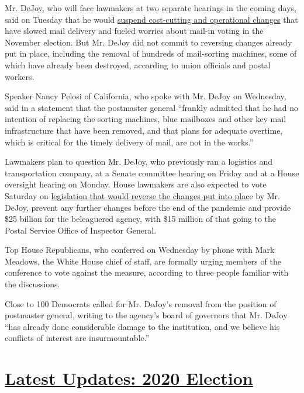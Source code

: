 Mr. DeJoy, who will face lawmakers at two separate hearings in the
coming days, said on Tuesday that he would
\href{https://www.nytimes3xbfgragh.onion/2020/08/18/us/politics/postal-service-suspends-changes.html}{suspend
cost-cutting and operational changes} that have slowed mail delivery and
fueled worries about mail-in voting in the November election. But Mr.
DeJoy did not commit to reversing changes already put in place,
including the removal of hundreds of mail-sorting machines, some of
which have already been destroyed, according to union officials and
postal workers.

Speaker Nancy Pelosi of California, who spoke with Mr. DeJoy on
Wednesday, said in a statement that the postmaster general ``frankly
admitted that he had no intention of replacing the sorting machines,
blue mailboxes and other key mail infrastructure that have been removed,
and that plans for adequate overtime, which is critical for the timely
delivery of mail, are not in the works.''

Lawmakers plan to question Mr. DeJoy, who previously ran a logistics and
transportation company, at a Senate committee hearing on Friday and at a
House oversight hearing on Monday. House lawmakers are also expected to
vote Saturday on
\href{https://rules.house.gov/sites/democrats.rules.house.gov/files/BILLS-116HR8015-RCP116-61.pdf}{legislation
that would reverse the changes put into plac}e by Mr. DeJoy, prevent any
further changes before the end of the pandemic and provide \$25 billion
for the beleaguered agency, with \$15 million of that going to the
Postal Service Office of Inspector General.

Top House Republicans, who conferred on Wednesday by phone with Mark
Meadows, the White House chief of staff, are formally urging members of
the conference to vote against the measure, according to three people
familiar with the discussions.

Close to 100 Democrats called for Mr. DeJoy's removal from the position
of postmaster general, writing to the agency's board of governors that
Mr. DeJoy ``has already done considerable damage to the institution, and
we believe his conflicts of interest are insurmountable.''

\hypertarget{latest-updates-2020-election}{%
\section{\texorpdfstring{\href{https://www.nytimes3xbfgragh.onion/live/2020/08/19/us/dnc-convention-election?action=click\&pgtype=Article\&state=default\&region=MAIN_CONTENT_1\&context=storylines_live_updates}{Latest
Updates: 2020
Election}}{Latest Updates: 2020 Election}}\label{latest-updates-2020-election}}

